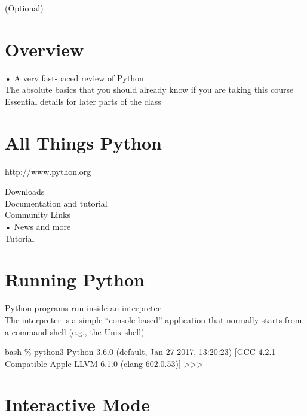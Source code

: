 \documentclass[
  letterpaper,
  DIV=11,
  numbers=noendperiod]{scrreprt}
\newenvironment{Shaded}{\begin{snugshade}}{\end{snugshade}}
\newcommand{\NormalTok}[1]{\textcolor[rgb]{0.00,0.23,0.31}{#1}}
\begin{document}
(Optional)


\chapter{Overview}\label{overview}

• A very fast-paced review of Python\\
The absolute basics that you should already know if you are taking this
course\\
Essential details for later parts of the class


\chapter{All Things Python}\label{all-things-python}

http://www.python.org

Downloads\\
Documentation and tutorial\\
Community Links\\
• News and more\\
Tutorial


\chapter{Running Python}\label{running-python}

Python programs run inside an interpreter\\
The interpreter is a simple ``console-based'' application that normally
starts from a command shell (e.g., the Unix shell)

\begin{Shaded}
\begin{Highlighting}[]
\NormalTok{bash \% python3  }
\NormalTok{Python 3.6.0 (default, Jan 27 2017, 13:20:23)  }
\NormalTok{[GCC 4.2.1 Compatible Apple LLVM 6.1.0 (clang{-}602.0.53)]  }
\NormalTok{\textgreater{}\textgreater{}\textgreater{} }
\end{Highlighting}
\end{Shaded}


\chapter{Interactive Mode}\label{interactive-mode}
\end{document}
